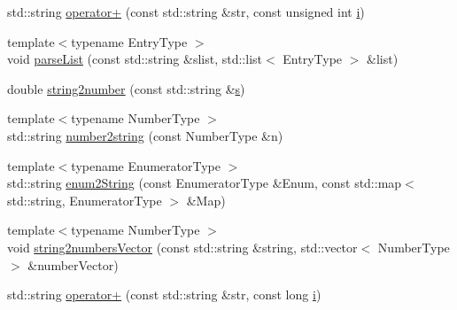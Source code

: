 \begin{DoxyCompactItemize}
std\-::string \hyperlink{namespaceLifeV_a54f5fa0ff0002920c744bcbaff350bc0}{operator+} (const std\-::string \&str, const unsigned int \hyperlink{god__e_8m_a8604be5925f4266ab5ccc69675329c80}{i})
\item 
{\footnotesize template$<$typename Entry\-Type $>$ }\\void \hyperlink{namespaceLifeV_a200b22ebae8c113c2624f7195797d4a4}{parse\-List} (const std\-::string \&slist, std\-::list$<$ Entry\-Type $>$ \&list)
\item 
double \hyperlink{namespaceLifeV_a95341022bde9111ea53dfe204cbe70ae}{string2number} (const std\-::string \&\hyperlink{god__e_8m_aaa7c61c7163e7fc36352afb33ce6c3dd}{s})
\item 
{\footnotesize template$<$typename Number\-Type $>$ }\\std\-::string \hyperlink{namespaceLifeV_a3c2a31cefb08654a69273a1a3bf11fac}{number2string} (const Number\-Type \&n)
\item 
{\footnotesize template$<$typename Enumerator\-Type $>$ }\\std\-::string \hyperlink{namespaceLifeV_a2e64a35012f78d9ab021477590e3bfaf}{enum2\-String} (const Enumerator\-Type \&Enum, const std\-::map$<$ std\-::string, Enumerator\-Type $>$ \&Map)
\item 
{\footnotesize template$<$typename Number\-Type $>$ }\\void \hyperlink{namespaceLifeV_a5f2c3319750ceebbeb2a3bb374a2596b}{string2numbers\-Vector} (const std\-::string \&string, std\-::vector$<$ Number\-Type $>$ \&number\-Vector)
\item 
std\-::string \hyperlink{namespaceLifeV_aed80af702e5521c5fc90b0c33bbd5af3}{operator+} (const std\-::string \&str, const long \hyperlink{god__e_8m_a8604be5925f4266ab5ccc69675329c80}{i})
\end{DoxyCompactItemize}


